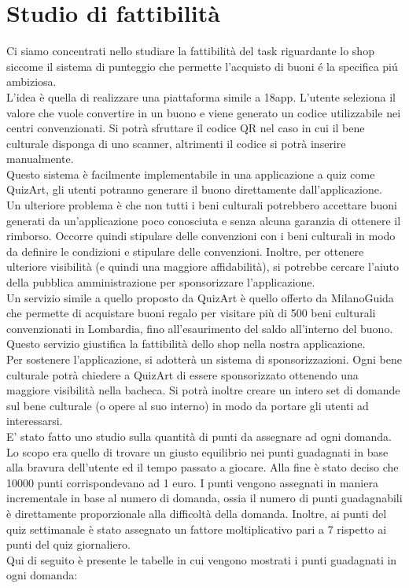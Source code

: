 \documentclass{article}
\begin{document}
\section{Studio di fattibilità}
Ci siamo concentrati nello studiare la fattibilità del task riguardante lo shop siccome il sistema di punteggio che permette l'acquisto di buoni é la specifica piú ambiziosa.
\\\indent
L’idea è quella di realizzare una piattaforma simile a 18app. L’utente seleziona il valore che vuole convertire in un buono e viene generato un codice utilizzabile nei centri convenzionati. Si potrà sfruttare il codice QR nel caso in cui il bene culturale disponga di uno scanner, altrimenti il codice si potrà inserire manualmente.
\\\indent
Questo sistema è facilmente implementabile in una applicazione a quiz come QuizArt, gli utenti potranno generare il buono direttamente dall’applicazione.
\\\indent
Un ulteriore problema è che non tutti i beni culturali potrebbero accettare buoni generati da un’applicazione poco conosciuta e senza alcuna garanzia di ottenere il rimborso. Occorre quindi stipulare delle convenzioni con i beni culturali in modo da definire le condizioni e stipulare delle convenzioni. Inoltre, per ottenere ulteriore visibilità (e quindi una maggiore affidabilità), si potrebbe cercare l’aiuto della pubblica amministrazione per sponsorizzare l’applicazione.
\\\indent
Un servizio simile a quello proposto da QuizArt è quello offerto da MilanoGuida che permette di acquistare buoni regalo per visitare più di 500 beni culturali convenzionati in Lombardia, fino all’esaurimento del saldo all’interno del buono. Questo servizio giustifica la fattibilità dello shop nella nostra applicazione.
\\\indent
Per sostenere l'applicazione, si adotterà un sistema di sponsorizzazioni. Ogni bene culturale potrà chiedere a QuizArt di essere sponsorizzato ottenendo una maggiore visibilità nella bacheca. Si potrà inoltre creare un intero set di domande sul bene culturale (o opere al suo interno) in modo da portare gli utenti ad interessarsi.
\\\indent
E’ stato fatto uno studio sulla quantità di punti da assegnare ad ogni domanda. Lo scopo era quello di trovare un giusto equilibrio nei punti guadagnati in base alla bravura dell’utente ed il tempo passato a giocare. Alla fine è stato deciso che 10000 punti corrispondevano ad 1 euro. I punti vengono assegnati in maniera incrementale in base al numero di domanda, ossia il numero di punti guadagnabili è direttamente proporzionale alla difficoltà della domanda. Inoltre, ai punti del quiz settimanale è stato assegnato un fattore moltiplicativo pari a 7 rispetto ai punti del quiz giornaliero.
\\\indent
Qui di seguito è presente le tabelle in cui vengono mostrati i punti guadagnati in ogni domanda:
\end{document}
